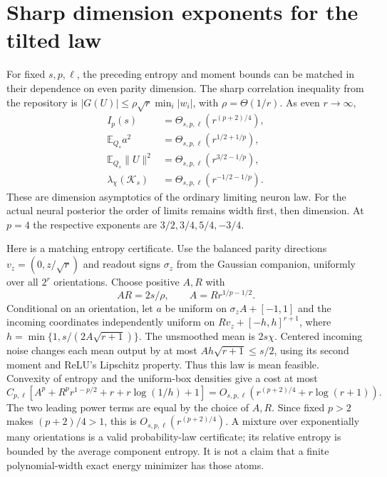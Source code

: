 \documentclass[11pt]{article}
\newcommand{\E}{\mathbb E}\newcommand{\Pp}{\mathbb P}
\begin{document}
\section{Sharp dimension exponents for the tilted law}
For fixed $s,p,\ell$, the preceding entropy and moment bounds can be
matched in their dependence on even parity dimension. The sharp
correlation inequality from the repository is
$|G(U)|\le\rho\sqrt r\min_i|w_i|$, with $\rho=\Theta(1/r)$.
As even $r\to\infty$,
\begin{align}
 I_p(s)&=\Theta_{s,p,\ell}(r^{(p+2)/4}),                  \tag{4}\\
 \E_{Q_s}a^2&=\Theta_{s,p,\ell}(r^{1/2+1/p}),             \tag{5}\\
 \E_{Q_s}\|U\|^2&=\Theta_{s,p,\ell}(r^{3/2-1/p}),         \tag{6}\\
 \lambda_\chi(\mathcal K_s)&=
       \Theta_{s,p,\ell}(r^{-1/2-1/p}).                  \tag{7}
\end{align}
These are dimension asymptotics of the ordinary limiting neuron law.
For the actual neural posterior the order of limits remains width first,
then dimension. At $p=4$ the respective exponents are
$3/2,3/4,5/4,-3/4$.

Here is a matching entropy certificate. Use the balanced parity directions
$v_z=(0,z/\sqrt r)$ and readout signs $\sigma_z$ from the Gaussian
companion, uniformly over all $2^r$ orientations. Choose positive $A,R$
with
\[
 AR=2s/\rho,\qquad A=Rr^{1/p-1/2}.
\]
Conditional on an orientation, let $a$ be uniform on
$\sigma_zA+[-1,1]$ and the incoming coordinates independently uniform
on $Rv_z+[-h,h]^{r+1}$, where
$h=\min\{1,s/(2A\sqrt{r+1})\}$.
The unsmoothed mean is $2s\chi$. Centered incoming noise changes each
mean output by at most $Ah\sqrt{r+1}\le s/2$, using its second moment
and ReLU's Lipschitz property. Thus this law is mean feasible.
Convexity of entropy and the uniform-box densities give a cost at most
\[
 C_{p,\ell}\left[A^p+R^p r^{1-p/2}+r+r\log(1/h)+1\right]
 =O_{s,p,\ell}(r^{(p+2)/4}+r\log(r+1)).
\]
The two leading power terms are equal by the choice of $A,R$.
Since fixed $p>2$ makes $(p+2)/4>1$, this is
$O_{s,p,\ell}(r^{(p+2)/4})$. A mixture over exponentially many
orientations is a valid probability-law certificate; its relative
entropy is bounded by the average component entropy. It is not a claim
that a finite polynomial-width exact energy minimizer has those atoms.
\end{document}

